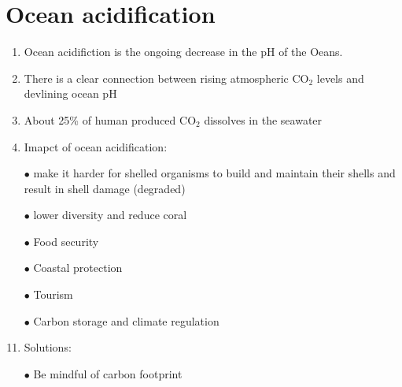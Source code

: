 \documentclass{report}
\begin{document}
\section{Ocean acidification}
\begin{enumerate}
    \item Ocean acidifiction is the ongoing decrease in the pH of the Oeans.
    \item There is a clear connection between rising atmospheric CO$_{2}$ levels and devlining ocean pH
    \item About 25\% of human produced CO$_{2}$ dissolves in the seawater
    \item Imapct of ocean acidification:
    \item [$\bullet$]make it harder for shelled organisms to build and maintain their shells and result in shell damage (degraded)
    \item [$\bullet$]lower diversity and reduce coral
    \item [$\bullet$]Food security
    \item [$\bullet$]Coastal protection
    \item [$\bullet$]Tourism
    \item [$\bullet$]Carbon storage and climate regulation
    \item Solutions:
    \item [$\bullet$]Be mindful of carbon footprint
\end{enumerate}
\end{document}
